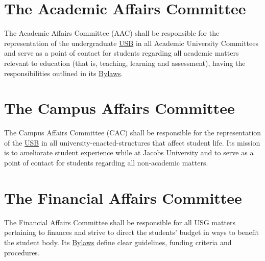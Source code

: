 \section{The Academic Affairs Committee}
\label{AACdef}
The Academic Affairs Committee (AAC) shall be responsible for the representation of the undergraduate \hyperref[studentbody]{USB} in all Academic University Committees and serve as a point of contact for students regarding all academic matters relevant to education (that is, teaching, learning and assessment), having the responsibilities outlined in its  \hyperref[AACByLawsdef]{Bylaws}.


\section{The Campus Affairs Committee} 
\label{CACdef}
The Campus Affairs Committee (CAC) shall be responsible for the representation of the \hyperref[studentbody]{USB} in all university-enacted-structures that affect student life. Its mission is to ameliorate student experience while at Jacobs University and to serve as a point of contact for students regarding all non-academic matters.

\section{The Financial Affairs Committee}
\label{Financesdef}
The Financial Affairs Committee shall be responsible for all USG matters pertaining to finances and strive to direct the students' budget in ways to benefit the student body. Its \hyperref[FinByLawsdef]{Bylaws} define clear guidelines, funding criteria and procedures.

\section{}
\label{IACdef}


